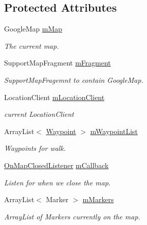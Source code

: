 \subsection*{Protected Attributes}
\begin{DoxyCompactItemize}
\item 
Google\+Map \hyperlink{classuk_1_1ac_1_1swan_1_1digitaltrails_1_1fragments_1_1_map_fragment_abc99770043e7270d681a55162785a5a4}{m\+Map}
\begin{DoxyCompactList}\small\item\em The current map. \end{DoxyCompactList}\item 
Support\+Map\+Fragment \hyperlink{classuk_1_1ac_1_1swan_1_1digitaltrails_1_1fragments_1_1_map_fragment_a39598ad7b75cd75ef1454af3e394edc6}{m\+Fragment}
\begin{DoxyCompactList}\small\item\em Support\+Map\+Fragemnt to contain Google\+Map. \end{DoxyCompactList}\item 
Location\+Client \hyperlink{classuk_1_1ac_1_1swan_1_1digitaltrails_1_1fragments_1_1_map_fragment_a906e60065eeb311eb30b372edb2f1447}{m\+Location\+Client}
\begin{DoxyCompactList}\small\item\em current Location\+Client \end{DoxyCompactList}\item 
Array\+List$<$ \hyperlink{classuk_1_1ac_1_1swan_1_1digitaltrails_1_1components_1_1_waypoint}{Waypoint} $>$ \hyperlink{classuk_1_1ac_1_1swan_1_1digitaltrails_1_1fragments_1_1_map_fragment_a6c44ef7f0370cc0a699c1cbe80f8c30e}{m\+Waypoint\+List}
\begin{DoxyCompactList}\small\item\em Waypoints for walk. \end{DoxyCompactList}\item 
\hyperlink{interfaceuk_1_1ac_1_1swan_1_1digitaltrails_1_1fragments_1_1_map_fragment_1_1_on_map_closed_listener}{On\+Map\+Closed\+Listener} \hyperlink{classuk_1_1ac_1_1swan_1_1digitaltrails_1_1fragments_1_1_map_fragment_a18de48be0fcafe966225e7f95feace5a}{m\+Callback}
\begin{DoxyCompactList}\small\item\em Listen for when we close the map. \end{DoxyCompactList}\item 
Array\+List$<$ Marker $>$ \hyperlink{classuk_1_1ac_1_1swan_1_1digitaltrails_1_1fragments_1_1_map_fragment_a00d1c005124f882b1b83a6190a6df9b3}{m\+Markers}
\begin{DoxyCompactList}\small\item\em Array\+List of Markers currently on the map. \end{DoxyCompactList}\end{DoxyCompactItemize}


